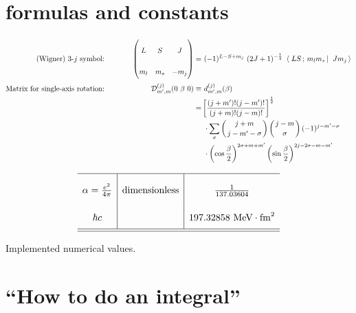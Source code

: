 \documentclass[onecolumn,preprint,superscriptaddress,nofootinbib,notitlepage,10pt,linenumbers]{revtex4-1}
\newcommand{\be}{\begin{equation}}
\newcommand{\ee}{\end{equation}}
\newcommand{\la}{\label}
\newcommand{\threej}[6]{\ensuremath{\begin{pmatrix}#1 & #2 & #3\\#4&#5&#6 \end{pmatrix}}}
\newcommand{\clg}[6]{\ensuremath{\left\langle\left.\,#1#2\,;\,#3#4\,\right\vert\right.\left.\,#5#6\,\right\rangle}}
\begin{document}
\newpage

\section{formulas and constants}

\begin{alignat}{2}
\text{(Wigner) 3-$j$ symbol:} &\hspace{1cm}& \threej{L}{S}{J}{m_l}{m_s}{-m_j}=&~(-1)^{L-S+m_j}~(2J+1)^{-\frac{1}{2}}~\clg{L}{S}{m_l}{m_s}{J}{m_j}\\
\text{Matrix for single-axis rotation:} &\hspace{1cm}&   \mathcal{D}_{m^\prime,m}^{(j)}(0~\beta~0)\equiv&~d_{m^\prime,m}^{(j)}(\beta)\nonumber\\
&\hspace{1cm}& =&\left[\frac{(j+m^\prime)!(j-m^\prime)!}{(j+m)!(j-m)!}\right]^\frac{1}{2}\nonumber\\
&\hspace{1cm}&&~\cdot\sum_\sigma\left(j+m\atop j-m^\prime-\sigma\right)\left(j-m\atop \sigma\right)(-1)^{j-m^\prime-\sigma}\nonumber\\
&\hspace{1cm}&&~\cdot\left(\cos\frac{\beta}{2}\right)^{2\sigma+m+m^\prime}\left(\sin\frac{\beta}{2}\right)^{2j-2\sigma-m-m^\prime}\\
\end{alignat}
\begin{table}
\be\la{tab.constants}
\renewcommand{\arraystretch}{2.4}
\setlength{\tabcolsep}{8pt}
\begin{array}{c|c|c}\hline
\alpha=\frac{e^2}{4\pi}&\text{dimensionless}&\frac{1}{137.03604}\\
\hbar c & & 197.32858~\text{MeV}\cdot\text{fm}^2 \\
\hline\hline
\end{array}
\ee
\caption{Implemented numerical values.}
\end{table}

\section{``How to do an integral''}
\end{document}
